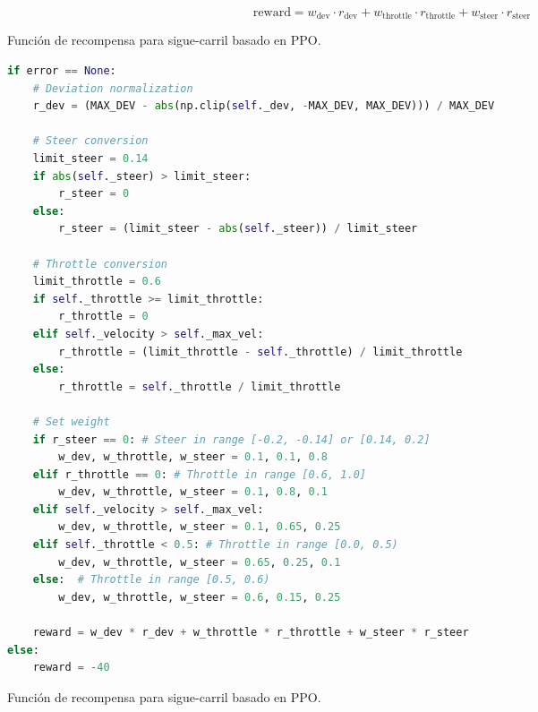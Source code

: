   \begin{myequation}[h]
    \begin{equation} 
      \text{reward} = w_{\text{dev}} \cdot r_{\text{dev}} + w_{\text{throttle}} \cdot r_{\text{throttle}} + w_{\text{steer}} \cdot r_{\text{steer}}
    \end{equation} 
    \caption{Función de recompensa para sigue-carril basado en \ac{PPO}.}
\label{eq:rew_ppo}
  \end{myequation}

\begin{code}[H]
\begin{lstlisting}[language=Python]
if error == None:
    # Deviation normalization
    r_dev = (MAX_DEV - abs(np.clip(self._dev, -MAX_DEV, MAX_DEV))) / MAX_DEV

    # Steer conversion
    limit_steer = 0.14
    if abs(self._steer) > limit_steer:
        r_steer = 0
    else:
        r_steer = (limit_steer - abs(self._steer)) / limit_steer

    # Throttle conversion
    limit_throttle = 0.6
    if self._throttle >= limit_throttle:
        r_throttle = 0
    elif self._velocity > self._max_vel:
        r_throttle = (limit_throttle - self._throttle) / limit_throttle
    else:
        r_throttle = self._throttle / limit_throttle

    # Set weight
    if r_steer == 0: # Steer in range [-0.2, -0.14] or [0.14, 0.2]
        w_dev, w_throttle, w_steer = 0.1, 0.1, 0.8
    elif r_throttle == 0: # Throttle in range [0.6, 1.0]
        w_dev, w_throttle, w_steer = 0.1, 0.8, 0.1
    elif self._velocity > self._max_vel:
        w_dev, w_throttle, w_steer = 0.1, 0.65, 0.25
    elif self._throttle < 0.5: # Throttle in range [0.0, 0.5)
        w_dev, w_throttle, w_steer = 0.65, 0.25, 0.1
    else:  # Throttle in range [0.5, 0.6)
        w_dev, w_throttle, w_steer = 0.6, 0.15, 0.25

    reward = w_dev * r_dev + w_throttle * r_throttle + w_steer * r_steer
else:
    reward = -40
\end{lstlisting}
\caption[Función de recompensa para sigue-carril basado en \ac{PPO}]{Función de recompensa para sigue-carril basado en \ac{PPO}.}
\label{cod:rew_ppo}
\end{code}

